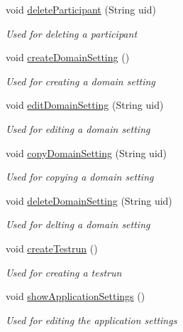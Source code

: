 \begin{DoxyCompactItemize}
void \hyperlink{class_web_analyzer_1_1_u_i_1_1_interaction_objects_1_1_navigation_a9decfd16b2f4b9c76ef7b18d4475f3cc}{delete\+Participant} (String uid)
\begin{DoxyCompactList}\small\item\em Used for deleting a participant \end{DoxyCompactList}\item 
void \hyperlink{class_web_analyzer_1_1_u_i_1_1_interaction_objects_1_1_navigation_aa873f627156d8e3c60d5ee5a46992add}{create\+Domain\+Setting} ()
\begin{DoxyCompactList}\small\item\em Used for creating a domain setting \end{DoxyCompactList}\item 
void \hyperlink{class_web_analyzer_1_1_u_i_1_1_interaction_objects_1_1_navigation_a5ece3b16607bfed3fe090e7013785238}{edit\+Domain\+Setting} (String uid)
\begin{DoxyCompactList}\small\item\em Used for editing a domain setting \end{DoxyCompactList}\item 
void \hyperlink{class_web_analyzer_1_1_u_i_1_1_interaction_objects_1_1_navigation_adef199c82c269af13ff92cfe5ab77d82}{copy\+Domain\+Setting} (String uid)
\begin{DoxyCompactList}\small\item\em Used for copying a domain setting \end{DoxyCompactList}\item 
void \hyperlink{class_web_analyzer_1_1_u_i_1_1_interaction_objects_1_1_navigation_a6f385b0975781d7c5f709c1b64bbc83d}{delete\+Domain\+Setting} (String uid)
\begin{DoxyCompactList}\small\item\em Used for delting a domain setting \end{DoxyCompactList}\item 
void \hyperlink{class_web_analyzer_1_1_u_i_1_1_interaction_objects_1_1_navigation_afe97f392f7bbb22c57b40600cefa9b9a}{create\+Testrun} ()
\begin{DoxyCompactList}\small\item\em Used for creating a testrun \end{DoxyCompactList}\item 
void \hyperlink{class_web_analyzer_1_1_u_i_1_1_interaction_objects_1_1_navigation_a963d1dcd3e6cd6f191145cb6ce14b21d}{show\+Application\+Settings} ()
\begin{DoxyCompactList}\small\item\em Used for editing the application settings \end{DoxyCompactList}\end{DoxyCompactItemize}
